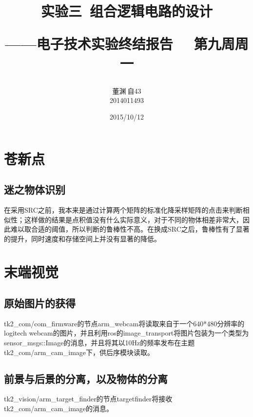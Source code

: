 \documentclass[a4paper,12pt]{article}
\author{董渊$\:$自43\\2014011493}
\title{实验三\ 组合逻辑电路的设计 \\
	\begin{flushright}
		\begin{large}
			——电子技术实验终结报告 \ \  第九周周一
		\end{large}
	\end{flushright}}
\date{2015/10/12 }
\begin{document}
\begin{spacing}{1}
\maketitle
\end{spacing}

\section{苍新点}
\subsection{迷之物体识别}
在采用SRC之前，我本来是通过计算两个矩阵的标准化降采样矩阵的点击来判断相似性；这样做的结果是点积值没有什么实际意义，对于不同的物体相差非常大，因此难以取合适的阈值，所以判断的鲁棒性不高。在换成SRC之后，鲁棒性有了显著的提升，同时速度和存储空间上并没有显著的降低。

\section{末端视觉}
\subsection{原始图片的获得}
tk2\_com/com\_firmware的节点arm\_webcam将读取来自于一个640*480分辨率的logitech webcam的图片，并且利用ros的image\_transport将图片包装为一个类型为sensor\_msgs::Image的消息，并且将其以10Hz的频率发布在主题tk2\_com/arm\_cam\_image下，供后序模块读取。
\subsection{前景与后景的分离，以及物体的分离}
tk2\_vision/arm\_target\_finder的节点targetfinder将接收tk2\_com/arm\_cam\_image的消息。
\end{document}

